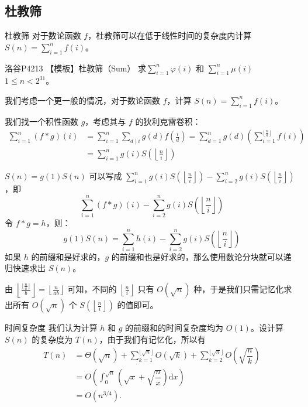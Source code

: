 \documentclass[UTF8]{beamer}
\begin{document}
    \subsection{杜教筛}
    \begin{frame}{杜教筛}
        对于数论函数 $f$，杜教筛可以在低于线性时间的复杂度内计算 $S(n)=\sum_{i=1}^{n}f(i)$。\\
        \begin{block}{洛谷P4213 【模板】杜教筛（Sum）}
            求$\sum_{i=1}^n\varphi(i)$ 和 $\sum_{i=1}^n\mu(i)$\\
            $1\le n<2^{31}$。
        \end{block}
        \pause
        我们考虑一个更一般的情况，对于数论函数 $f$，计算 $S(n)=\sum_{i=1}^{n}f(i)$。
        \pause

        我们找一个积性函数 $g$，考虑其与 $f$ 的狄利克雷卷积：
        $$
        \begin{aligned}
            \sum_{i=1}^{n}(f * g)(i) & =\sum_{i=1}^{n}\sum_{d \mid i}g(d)f\left(\frac{i}{d}\right)=\sum_{d=1}^ng(d)\left(\sum_{i=1}^{\lfloor\frac{n}{d}\rfloor}f(i)\right)\\
                                    & =\sum_{i=1}^{n}g(i)S\left(\left\lfloor\frac{n}{i}\right\rfloor\right)
        \end{aligned}
        $$ 
    \end{frame}
    \begin{frame}
        $S(n)=g(1)S(n)$ 可以写成 $\sum_{i=1}^{n}g(i)S\left(\left\lfloor\frac{n}{i}\right\rfloor\right)-\sum_{i=2}^{n}g(i)S\left(\left\lfloor\frac{n}{i}\right\rfloor\right)$，即\\
        $$
        \sum_{i=1}^{n}(f * g)(i)-\sum_{i=2}^ng(i)S(\left\lfloor\frac{n}{i}\right\rfloor)
        $$
        \pause
        令 $f\ast g=h$，则：
        $$
        g(1)S(n)=\sum_{i=1}^{n}h(i)-\sum_{i=2}^ng(i)S(\left\lfloor\frac{n}{i}\right\rfloor)
        $$
        如果 $h$ 的前缀和是好求的，$g$ 的前缀和也是好求的，那么使用数论分块就可以递归快速求出 $S(n)$。

        \pause

        由 $\left\lfloor\frac{\lfloor\frac na\rfloor}{b}\right\rfloor=\left\lfloor\frac{n}{ab}\right\rfloor$ 可知，不同的 $\left\lfloor\frac{n}{i}\right\rfloor$ 只有 $O(\sqrt n)$ 种，于是我们只需记忆化求出所有 $O(\sqrt n)$ 个 $S(\left\lfloor\frac{n}{i}\right\rfloor)$ 的值即可。
    \end{frame}
    \begin{frame}{时间复杂度}
        我们认为计算 $h$ 和 $g$ 的前缀和的时间复杂度均为 $O(1)$。设计算 $S(n)$ 的复杂度为 $T(n)$，由于我们有记忆化，所以有
$$
\begin{aligned}
    T(n) & = \Theta(\sqrt n)+\sum_{k=1}^{\lfloor\sqrt n\rfloor} O(\sqrt k)+\sum_{k=2}^{\lfloor\sqrt n\rfloor} O\left(\sqrt{\dfrac{n}{k}}\right)\\
         & = O\left(\int_{0}^{\sqrt n} \left(\sqrt{x} + \sqrt{\dfrac{n}{x}}\right) \mathrm{d}x\right)\\
         & = O\left(n^{3/4}\right).
\end{aligned}
$$
\end{frame}
\end{document}
